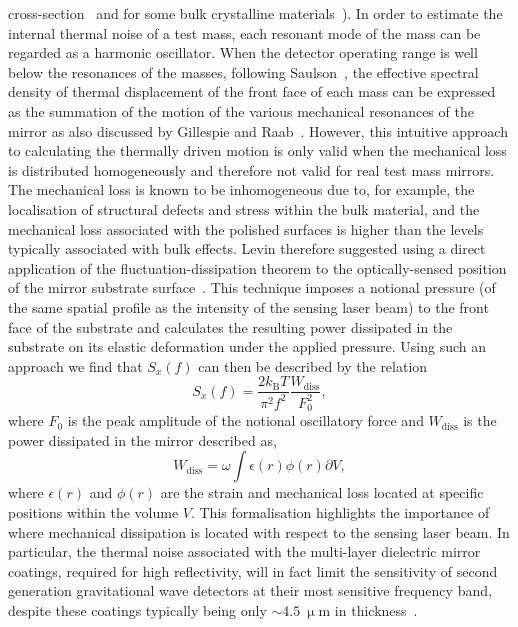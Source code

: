 \documentclass{article}
\begin{document}
cross-section~\cite{Nowick} and for some bulk crystalline
materials~\cite{Bragthermo}). In order to estimate the internal thermal noise of
a test mass, each resonant mode of the mass can be regarded as a harmonic
oscillator. When the detector operating range is well below the resonances of
the masses, following Saulson~\cite{Saulson2}, the effective spectral density of
thermal displacement of the front face of each mass can be expressed as the
summation of the motion of the various mechanical resonances of the mirror as
also discussed by Gillespie and Raab~\cite{Gillespie}. However, this intuitive
approach to calculating the thermally driven motion is only valid when the
mechanical loss is distributed homogeneously and therefore not valid for real
test mass mirrors. The mechanical loss is known to be inhomogeneous due to, for
example, the localisation of structural defects and stress within the bulk
material, and the mechanical loss associated with the polished surfaces is
higher than the levels typically associated with bulk effects.  Levin therefore
suggested using a direct application of the fluctuation-dissipation theorem to
the optically-sensed position of the mirror substrate surface~\cite{Levin}. 
This technique imposes a notional pressure (of the same spatial profile as the
intensity of the sensing laser beam) to the front face of the substrate and
calculates the resulting power dissipated in the substrate on its elastic
deformation under the applied pressure.  Using such an approach we find that
$S_x(f)$ can then be described by the relation
\begin{equation}
 S_x(f) = \frac{2k_\mathrm{B}T}{\pi^2 f^2} \frac{W_\mathrm{{diss}}}{F_0^2},
 \label{eqn:S-x_Levin}
\end{equation}
where $F_0$ is the peak amplitude of the notional oscillatory force and 
$W_\mathrm{{diss}}$ is the power dissipated in the mirror described as,
\begin{equation}
 W_\mathrm{{diss}} = \omega \int{\epsilon(r)\phi(r)\partial V},
 \label{eqn:S-x_Levin2}
\end{equation}
where $\epsilon(r)$ and $\phi(r)$ are the strain and mechanical loss located at
specific positions within the volume $V$. This formalisation highlights the
importance of where mechanical dissipation is located with respect to the
sensing laser beam.  In particular, the thermal noise associated with the
multi-layer dielectric mirror coatings, required for high reflectivity, will in
fact limit the sensitivity of second generation gravitational wave detectors at
their most sensitive frequency band, despite these coatings typically being only
$\sim 4.5~\upmu\textrm{m}$ in thickness~\cite{Harry:2002}.
\end{document}
